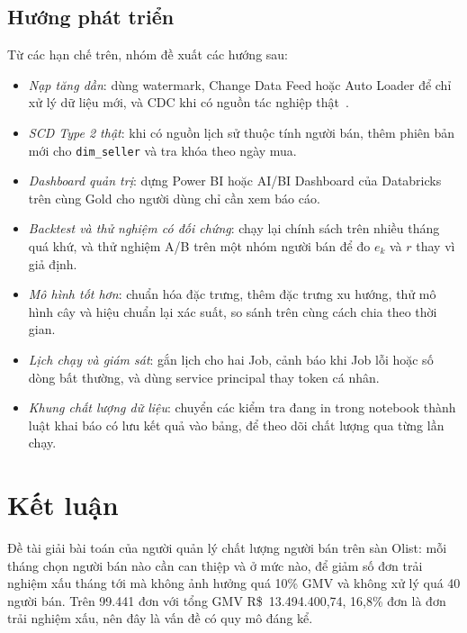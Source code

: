 \documentclass[a4paper]{article}
\begin{document}
\subsection{Hướng phát triển}
\label{subsec:6_4}

Từ các hạn chế trên, nhóm đề xuất các hướng sau:
\begin{itemize}
  \item \textit{Nạp tăng dần}: dùng watermark, Change Data Feed hoặc Auto Loader để chỉ xử lý dữ liệu mới, và CDC khi có nguồn tác nghiệp thật~\cite{bib:databricks}.
  \item \textit{SCD Type 2 thật}: khi có nguồn lịch sử thuộc tính người bán, thêm phiên bản mới cho \texttt{dim\_seller} và tra khóa theo ngày mua.
  \item \textit{Dashboard quản trị}: dựng Power BI hoặc AI/BI Dashboard của Databricks trên cùng Gold cho người dùng chỉ cần xem báo cáo.
  \item \textit{Backtest và thử nghiệm có đối chứng}: chạy lại chính sách trên nhiều tháng quá khứ, và thử nghiệm A/B trên một nhóm người bán để đo $e_k$ và $r$ thay vì giả định.
  \item \textit{Mô hình tốt hơn}: chuẩn hóa đặc trưng, thêm đặc trưng xu hướng, thử mô hình cây và hiệu chuẩn lại xác suất, so sánh trên cùng cách chia theo thời gian.
  \item \textit{Lịch chạy và giám sát}: gắn lịch cho hai Job, cảnh báo khi Job lỗi hoặc số dòng bất thường, và dùng service principal thay token cá nhân.
  \item \textit{Khung chất lượng dữ liệu}: chuyển các kiểm tra đang in trong notebook thành luật khai báo có lưu kết quả vào bảng, để theo dõi chất lượng qua từng lần chạy.
\end{itemize}

\section{Kết luận}
\label{sec:ch7}

Đề tài giải bài toán của người quản lý chất lượng người bán trên sàn Olist: mỗi tháng chọn người bán nào cần can thiệp và ở mức nào, để giảm số đơn trải nghiệm xấu tháng tới mà không ảnh hưởng quá 10\% GMV và không xử lý quá 40 người bán. Trên 99.441 đơn với tổng GMV R\$~13.494.400,74, 16,8\% đơn là đơn trải nghiệm xấu, nên đây là vấn đề có quy mô đáng kể.
\end{document}
